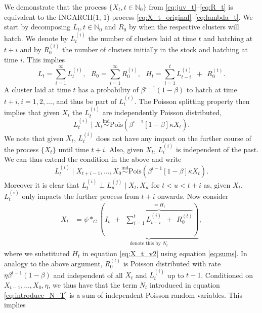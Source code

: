 \documentclass{article}
\begin{document}
We demonstrate that the process $\{X_t, t \in \mathbb{N}_0\}$ from \eqref{eq:juv_t}--\eqref{eq:R_t} is equivalent to the INGARCH(1, 1) process \eqref{eq:X_t_original}--\eqref{eq:lambda_t}. We start by decomposing $L_t, t \in \mathbb{N}_0$ and $R_0$ by when the respective clusters will hatch. We denote by $L_t^{(i)}$ the number of clusters laid at time $t$ and hatching at $t + i$ and by $R^{(i)}_0$ the number of clusters initially in the stock and hatching at time $i$. This implies
\begin{equation}
L_t = \sum_{i = 1}^\infty L_t^{(i)}, \ \ \ 
R_0 = \sum_{i = 1}^\infty R_0^{(i)}, \ \ \ 
H_t = \sum_{i = 1}^{t} L_{t - i}^{(i)} \ \ + \ \ R_0^{(t)}.
\label{eq:sums}
\end{equation}
A cluster laid at time $t$ has a probability of $\beta^{i - 1}(1 - \beta)$ to hatch at time $t + i, i = 1, 2, \dots$, and thus be part of $L_t^{(i)}$. The Poisson splitting property \cite{Kingman1993} then implies that given $X_t$ the $L_t^{(i)}$ are independently Poisson distributed,
$$
L_t^{(i)} \mid X_t \stackrel{\text{ind}}{\sim} \text{Pois}(\beta^{i - 1}[1 - \beta]\kappa X_t). %
$$
We note that given $X_t$, $L_t^{(i)}$ does not have any impact on the further course of the process $\{X_t\}$ until time $t + i$. Also, given $X_t$, $L_t^{(i)}$ is independent of the past. We can thus extend the condition in the above and write
$$
L_t^{(i)} \mid X_{t + i - 1}, \dots, X_0 \stackrel{\text{ind}}{\sim} \text{Pois}(\beta^{i - 1}[1 - \beta]\kappa X_t). %
$$
Moreover it is clear that $L_t^{(i)} \perp L_u^{(j)} \mid X_t, X_u$ for $t < u < t + i$ as, given $X_t$, $L_t^{(i)}$ only impacts the further process from $t + i$ onwards. Now consider
\begin{align}
X_t & = \psi *_G \underbrace{\left( I_t \ \ + \ \ \overbrace{\sum_{i = 1}^{t} L_{t - i}^{(i)} \ \ + \ \ R_0^{(t)}}^{= H_t}\right)}_{\text{denote this by } N_t}, \label{eq:introduce_N_T}
\end{align}
where we substituted $H_t$ in equation \eqref{eq:X_t_v2} using equation \eqref{eq:sums}. In analogy to the above argument, $R_0^{(t)}$ is Poisson distributed with rate $\eta\beta^{t - 1}(1 - \beta)$ and independent of all $X_t$ and $L_t^{(i)}$ up to $t - 1$. Conditioned on $X_{t - 1}, \dots, X_0, \eta$, we thus have that the term $N_t$ introduced in equation \eqref{eq:introduce_N_T} is a sum of independent Poisson random variables. This implies
\end{document}
